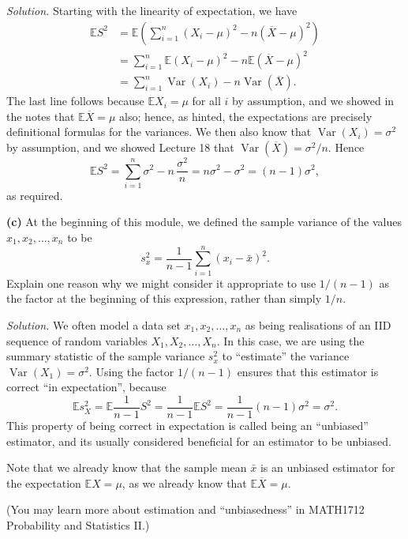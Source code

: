 \documentclass[
  a4paper,
]{book}
\theoremstyle{definition}
\theoremstyle{definition}
\theoremstyle{definition}
\theoremstyle{definition}
\theoremstyle{remark}
\begin{document}
\begin{myanswers}
\emph{Solution.} Starting with the linearity of expectation, we have
\begin{align*}
\mathbb ES^2 &= \mathbb E \left( \sum_{i=1}^n (X_i - \mu)^2 - n(\overline X - \mu)^2  \right) \\
  &= \sum_{i=1}^n \mathbb E (X_i - \mu)^2 - n \mathbb E(\overline X - \mu)^2 \\
  &= \sum_{i=1}^n \operatorname{Var}(X_i) - n \operatorname{Var}(\overline X) .
\end{align*}
The last line follows because \(\mathbb EX_i = \mu\) for all \(i\) by assumption, and we showed in the notes that \(\mathbb E \overline X = \mu\) also; hence, as hinted, the expectations are precisely definitional formulas for the variances. We then also know that \(\operatorname{Var}(X_i) = \sigma^2\) by assumption, and we showed Lecture 18 that \(\operatorname{Var}(\overline X) = \sigma^2/n\). Hence
\[ \mathbb ES^2 = \sum_{i=1}^n \sigma^2 - n\, \frac{\sigma^2}{n} = n \sigma^2 - \sigma^2 = (n-1)\sigma^2, \]
as required.

\end{myanswers}

\textbf{(c)} At the beginning of this module, we defined the sample variance of the values \(x_1, x_2, \dots, x_n\) to be
\[ s^2_x = \frac{1}{n-1} \sum_{i=1}^n (x_i - \bar x)^2 . \]
Explain one reason why we might consider it appropriate to use \(1/(n-1)\) as the factor at the beginning of this expression, rather than simply \(1/n\).

\begin{myanswers}
\emph{Solution.}
We often model a data set \(x_1, x_2, \dots, x_n\) as being realisations of an IID sequence of random variables \(X_1, X_2, \dots, X_n\). In this case, we are using the summary statistic of the sample variance \(s_x^2\) to ``estimate'' the variance \(\operatorname{Var}(X_1) = \sigma^2\). Using the factor \(1/(n-1)\) ensures that this estimator is correct ``in expectation'', because
\[ \mathbb E s_X^2 = \mathbb E \frac{1}{n-1}S^2 = \frac{1}{n-1} \mathbb ES^2 = \frac{1}{n-1}(n-1)\sigma^2 = \sigma^2 . \]
This property of being correct in expectation is called being an ``unbiased'' estimator, and its usually considered beneficial for an estimator to be unbiased.

Note that we already know that the sample mean \(\bar x\) is an unbiased estimator for the expectation \(\mathbb EX = \mu\), as we already know that \(\mathbb E\overline X = \mu\).

(You may learn more about estimation and ``unbiasedness'' in MATH1712 Probability and Statistics II.)

\end{myanswers}
\end{document}
